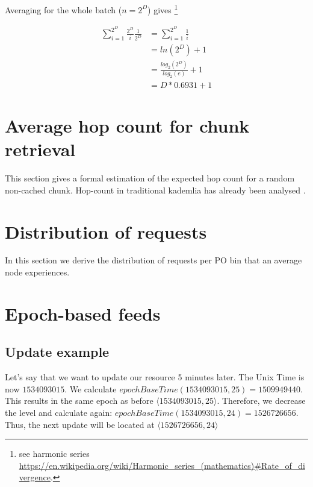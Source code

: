 Averaging for the whole batch ($n=2^D$) gives%
%
\footnote{see harmonic series 
\url{https://en.wikipedia.org/wiki/Harmonic\_series\_(mathematics)\#Rate\_of\_divergence}.}

 \begin{subequations}   \begin{align}
\sum_{i=1}^{2^D}\frac{2^D}{i}\frac{1}{2^D}
&=\sum_{i=1}^{2^D}\frac{1}{i}\\
&=\mathit{ln}(2^D)+1\\
&=\frac{\mathit{log}_2(2^D)}{\mathit{log}_2(e)}+1\\
&=D*0.6931+1
\end{align} \end{subequations}

\section{Average hop count for chunk retrieval  \statusred}

This section gives a formal estimation of the expected hop count for a random non-cached chunk.  
Hop-count in traditional kademlia has already been  analysed \cite{roos2013comprehending, roos2015determining}.

\section{Distribution of requests \statusred}

In this section we derive the distribution of requests per PO bin that an average node experiences.

\section{Epoch-based feeds \statusgreen}\label{sec:epoch-based-feeds-appendix}
\subsection*{Update example \statusgreen}
 
Let's say that we want to update our resource 5 minutes later. The Unix Time is now $1534093015$.
We calculate $\mathit{epochBaseTime}(1534093015, 25) = 1509949440$.
This results in the same epoch as before $\langle  1534093015, 25\rangle$. Therefore, we decrease the level and calculate again:
$\mathit{epochBaseTime}(1534093015, 24) = 1526726656$. Thus, the next update will be located at $\langle  1526726656, 24\rangle$

